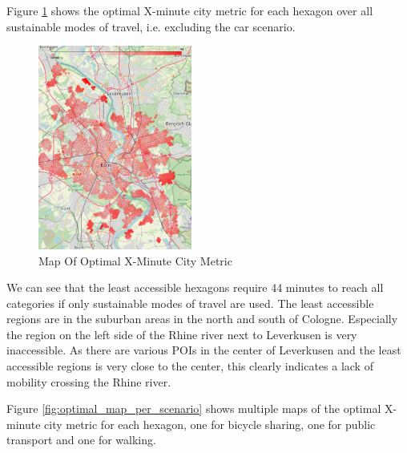 Figure \ref{fig:optimal_map} shows the optimal X-minute city metric for each hexagon over all sustainable modes of travel, i.e. excluding the car scenario.

\begin{figure}
  \begin{center}
    \includegraphics[width=0.45\textwidth]{Figures/results/minute_city_metric/optimal_map}
  \end{center}
  \caption{Map Of Optimal X-Minute City Metric}
  \label{fig:optimal_map}
\end{figure}

We can see that the least accessible hexagons require 44 minutes to reach all categories if only sustainable modes of travel are used.
The least accessible regions are in the suburban areas in the north and south of Cologne. 
Especially the region on the left side of the Rhine river next to Leverkusen is very inaccessible.
As there are various POIs in the center of Leverkusen and the least accessible regions is very close to the center, this clearly indicates a lack of mobility crossing the Rhine river.

Figure \ref{fig:optimal_map_per_scenario} shows multiple maps of the optimal X-minute city metric for each hexagon, one for bicycle sharing, one for public transport and one for walking.


